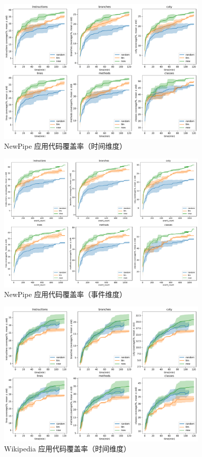 \documentclass[twocolumn, 10pt]{article}
\begin{document}
\begin{figure}[H]
\centering
\includegraphics[width=0.9\textwidth]{org.schabi.newpipe.debug/coverage_time.pdf}
\caption{NewPipe 应用代码覆盖率（时间维度）}
\end{figure}
\begin{figure}[H]
\centering
\includegraphics[width=0.9\textwidth]{org.schabi.newpipe.debug/coverage_event.pdf}
\caption{NewPipe 应用代码覆盖率（事件维度）}

\end{figure}
\begin{figure}[H]
\centering
\includegraphics[width=0.9\textwidth]{org.wikipedia.alpha/coverage_time.pdf}
\caption{Wikipedia 应用代码覆盖率（时间维度）}
\end{figure}
\end{document}
